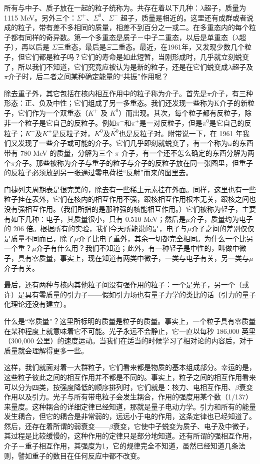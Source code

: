 所有与中子、质子放在一起的粒子统称为。共存在着以下几种：$\lambda$超子，质量为 1115 MeV。另外三个：$\Sigma^{+}$、$\Sigma^{0}$、$\Sigma^{-}$ 超子，质量是相近的。这里还有成群或者说成的粒子，带有差不多相同的质量，相差不到百分之一或二。在多重态内的每个粒子都有同样的奇异数。第一个多重态是质子－中子二重态，以后是单重态（$\lambda$超子），再以后是 $ \Sigma $三重态，最后是$ \Xi $二重态。最近，在1961年，又发现少数几个粒子，但它们都是粒子吗？它们的寿命是如此短暂，当刚形成时，几乎就立刻蜕变了，所以我们不知道，它们究竟应被认为是新的粒子，还是在它们蜕变成$\lambda$超子及$\pi$介子时，后二者之间某种确定能量的“共振”作用呢？

除去重子外，其它包括在核内相互作用中的粒子称为介子。首先是$\pi$介子，有三种形态：正、负及中性；它们组成了另一多重态。我们还发现一些称为K介子的新粒子，它们作为一个双重态（$K^{+}$ 及 $K^{0}$）而出现。其次，每个粒子都有反粒子，除非一个粒子是它自己的反粒子。例如$\pi^{-} $和$\pi^{+} $是一对反粒子，但是$\pi^0 $是它自己的反粒子；$K^- $及$ K^+ $是反粒子对，$ { K }^{ 0 } $及$ \bar {{ K }^{ 0 } }  $也是反粒子对。附带说一下，在 1961 年我们又发现了一些介子或可能的介子。它们几乎即刻就蜕变了，有一个称为$\omega$的东西带有 780 MeV 的质量，分解为三个 $\pi$ 介子，有一个还不怎么确定的东西分解为两个$\pi$介子。那些被称为介子与重子的粒子与介子的反粒子放在同一张图里，但重子的反粒子必须放到另一张通过零电荷栏“反射”而来的图里去。

门捷列夫周期表是很完美的，除去有一些稀土元素挂在外面。同样，这里也有一些粒子挂在表外，它们在核内的相互作用不强，跟核相互作用根本无关，跟核之间也没有强相互作用。（我们所指的是那种强的核能相互作用。）它们被称为轻子，主要有如下几种：电子，其质量很小，只有 0.510 MeV；然后是$\mu$介子，质量约为电子的 206 倍。根据所有的实验，我们今天所能说的是，电子与$\mu$介子之间的差别仅仅是质量不同而已，除了$\mu$介子比电子重外，其余一切都完全相同。为什么一个比另一个重？$\mu$介子有什么用？我们不知道；此外，有一种轻子是中性的，叫做中微子，具有零质量，事实上，现在知道有两类中微子，一类与电子有关，另一类与$\mu$介子有关。

最后，还有两种与核内其他粒子间没有强作用的粒子：一个是光子，另一个（或许）是具有零质量的引力子——假如引力场也有量子力学的类比的话（引力的量子化理论还没有建立）。

什么是“零质量”？这里所标明的质量是粒子的质量。事实上，一个粒子具有零质量在某种程度上就意味着它不可能。光子永远不会静止，它一直以每秒 186,000 英里（300,000 公里）的速度运动。当我们在适当的时候学习了相对论的内容后，对于质量就会理解得更多一些。

这样，我们就面对着一大群粒子，它们看来都是物质的基本组成部分。幸运的是，这些粒子彼此之间的相互作用并不都是不同的。事实上，粒子之间的相互作用看来可以分为四类，按强度降低的顺序排列时，它们就是：核力、电相互作用、$\beta$衰变作用以及引力。光子与所有带电粒子会发生耦合，作用的强度用某个数（1/137）来量度。这种耦合的详细定律已经知道，那就是量子电动力学。引力和所有的能量发生耦合，但它的耦合是非常弱的，远远小于电的作用，这条定律也已经知道了。然后，还存在着所谓的弱衰变——$\beta$衰变，它使中子蜕变为质子、电子及中微子，其过程是比较缓慢的，这种作用的定律只是部分地知道。还有所谓的强相互作用，介子－重子相互作用，其强度为1，它的规律完全不知道，虽然已经知道几条法则，譬如重子的数目在任何反应中都不改变。


